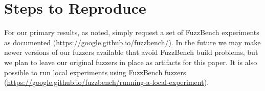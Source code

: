 \documentclass[manuscript,screen,review]{acmart}
\begin{document}
\section{Steps to Reproduce}

For our primary results, as noted, simply request a set of FuzzBench
experiments as documented
(\url{https://google.github.io/fuzzbench/}).  In the future we may
make newer versions of our fuzzers available that avoid FuzzBench
build problems, but we plan to leave our original fuzzers in place as
artifacts for this paper.  It is also possible to run local
experiments using FuzzBench fuzzers
(\url{https://google.github.io/fuzzbench/running-a-local-experiment}).




\end{document}
